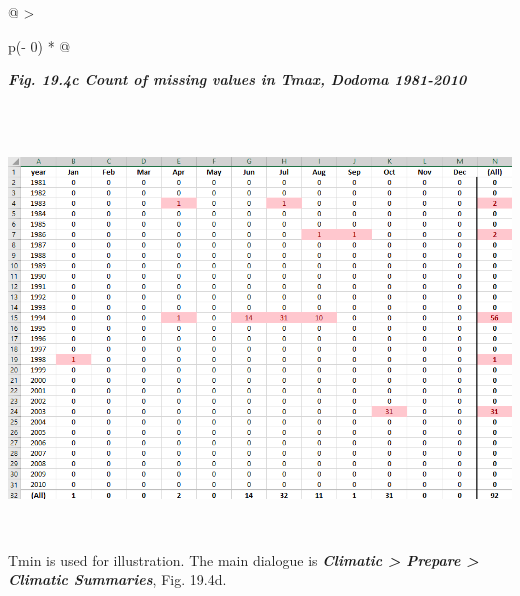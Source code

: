 \documentclass[
  letterpaper,
  DIV=11,
  numbers=noendperiod]{scrreprt}
\begin{document}
\begin{longtable}[]{@{}
  >{\raggedright\arraybackslash}p{(\columnwidth - 0\tabcolsep) * }@{}}
\toprule\noalign{}
\begin{minipage}[b]{\linewidth}\raggedright
\textbf{\emph{Fig. 19.4c Count of missing values in Tmax, Dodoma
1981-2010}}
\end{minipage} \\
\midrule\noalign{}
\endhead
\bottomrule\noalign{}
\endlastfoot
\includegraphics[width=6.26806in,height=4.25625in]{figures/Fig19.4c.png} \\
\end{longtable}

Tmin is used for illustration. The main dialogue is
\textbf{\emph{Climatic \textgreater{} Prepare \textgreater{} Climatic
Summaries}}, Fig. 19.4d.
\end{document}
